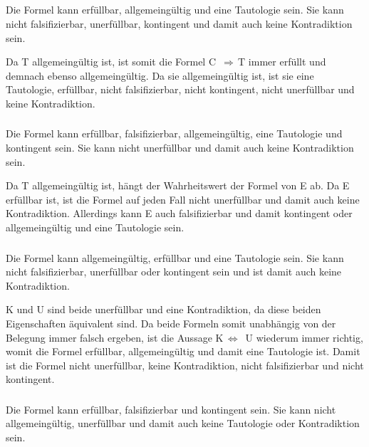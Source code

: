 \documentclass[10pt,a4paper,oneside,ngerman,numbers=noenddot]{scrartcl}
\begin{document}
\subsection{} %
\subsubsection{} %
Die Formel kann erfüllbar, allgemeingültig und eine Tautologie sein. Sie kann nicht falsifizierbar, unerfüllbar, kontingent und damit auch keine Kontradiktion sein.

Da T allgemeingültig ist, ist somit die Formel C $\, \Rightarrow \,$T immer erfüllt und demnach ebenso allgemeingültig. Da sie allgemeingültig ist, ist sie eine Tautologie, erfüllbar, nicht falsifizierbar, nicht kontingent, nicht unerfüllbar und keine Kontradiktion.
\subsubsection{} %
Die Formel kann erfüllbar, falsifizierbar, allgemeingültig, eine Tautologie und kontingent sein. Sie kann nicht unerfüllbar und damit auch keine Kontradiktion sein.

Da T allgemeingültig ist, hängt der Wahrheitswert der Formel von E ab. Da E erfüllbar ist, ist die Formel auf jeden Fall nicht unerfüllbar und damit auch keine Kontradiktion. Allerdings kann E auch falsifizierbar und damit kontingent oder allgemeingültig und eine Tautologie sein. 
\subsubsection{} %
Die Formel kann allgemeingültig, erfüllbar und eine Tautologie sein. Sie kann nicht falsifizierbar, unerfüllbar oder kontingent sein und ist damit auch keine Kontradiktion.

K und U sind beide unerfüllbar und eine Kontradiktion, da diese beiden Eigenschaften äquivalent sind. Da beide Formeln somit unabhängig von der Belegung immer falsch ergeben, ist die Aussage K$\, \Leftrightarrow \,$ U wiederum immer richtig, womit die Formel erfüllbar, allgemeingültig und damit eine Tautologie ist. Damit ist die Formel nicht unerfüllbar, keine Kontradiktion, nicht falsifizierbar und nicht kontingent. 
\subsubsection{} %
Die Formel kann erfüllbar, falsifizierbar und kontingent sein. Sie kann nicht allgemeingültig, unerfüllbar und damit auch keine Tautologie oder Kontradiktion sein.
\end{document}
